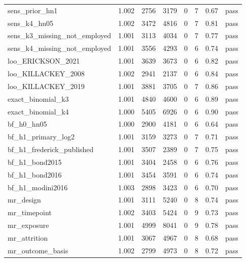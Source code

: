 \begin{tabular}{llrrrrll}
sens\_prior\_hn1 & 1.002 & 2756 & 3179 & 0 & 7 & 0.67 & pass\\
sens\_k4\_hn05 & 1.002 & 3472 & 4816 & 0 & 7 & 0.81 & pass\\
sens\_k3\_missing\_not\_employed & 1.001 & 3113 & 4034 & 0 & 7 & 0.77 & pass\\
sens\_k4\_missing\_not\_employed & 1.001 & 3556 & 4293 & 0 & 6 & 0.74 & pass\\
loo\_ERICKSON\_2021 & 1.001 & 3639 & 3673 & 0 & 6 & 0.82 & pass\\
loo\_KILLACKEY\_2008 & 1.002 & 2941 & 2137 & 0 & 6 & 0.84 & pass\\
loo\_KILLACKEY\_2019 & 1.001 & 3881 & 3705 & 0 & 7 & 0.86 & pass\\
exact\_binomial\_k3 & 1.001 & 4840 & 4600 & 0 & 6 & 0.89 & pass\\
exact\_binomial\_k4 & 1.000 & 5405 & 6926 & 0 & 6 & 0.90 & pass\\
bf\_h0\_hn05 & 1.000 & 2900 & 4181 & 0 & 6 & 0.64 & pass\\
bf\_h1\_primary\_log2 & 1.001 & 3159 & 3273 & 0 & 7 & 0.71 & pass\\
bf\_h1\_frederick\_published & 1.001 & 3507 & 2389 & 0 & 7 & 0.75 & pass\\
bf\_h1\_bond2015 & 1.001 & 3404 & 2458 & 0 & 6 & 0.76 & pass\\
bf\_h1\_bond2016 & 1.001 & 3454 & 3591 & 0 & 6 & 0.74 & pass\\
bf\_h1\_modini2016 & 1.003 & 2898 & 3423 & 0 & 6 & 0.70 & pass\\
mr\_design & 1.001 & 3111 & 5240 & 0 & 8 & 0.74 & pass\\
mr\_timepoint & 1.002 & 3403 & 5424 & 0 & 9 & 0.73 & pass\\
mr\_exposure & 1.001 & 4999 & 8041 & 0 & 9 & 0.78 & pass\\
mr\_attrition & 1.001 & 3067 & 4967 & 0 & 8 & 0.68 & pass\\
mr\_outcome\_basis & 1.002 & 2799 & 4973 & 0 & 8 & 0.72 & pass\\
\bottomrule
\end{tabular}
